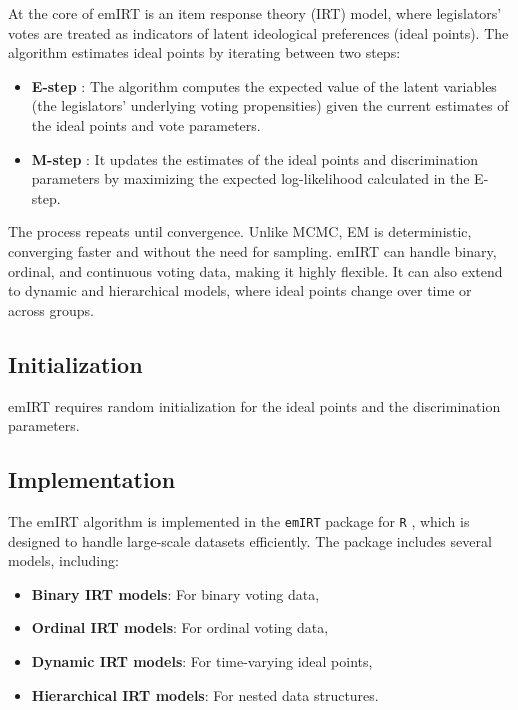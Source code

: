 \documentclass{report}
\begin{document}
                At the core of emIRT is an item response theory (IRT) model, where legislators' votes are treated as
                indicators of latent ideological preferences (ideal points). The algorithm estimates ideal points by
                iterating between two steps:
                \begin{itemize}
                    \item \textbf{E-step}
                    : The algorithm computes the expected value of the latent variables (the legislators' underlying
                    voting propensities) given the current estimates of the ideal points and vote parameters.
                    \item \textbf{M-step}
                    : It updates the estimates of the ideal points and discrimination parameters by maximizing the
                    expected log-likelihood calculated in the E-step.
                \end{itemize}
                The process repeats until convergence. Unlike MCMC, EM is deterministic, converging faster and without
                the need for sampling. emIRT can handle binary, ordinal, and continuous voting data, making it highly
                flexible. It can also extend to dynamic and hierarchical models, where ideal points change over
                time or across groups.

            \subsection{Initialization}
                emIRT requires random initialization for the ideal points and the discrimination
                parameters.

            \subsection{Implementation}
                The emIRT algorithm is implemented in the \texttt{emIRT} package for \texttt{R}
                , which is designed to handle large-scale datasets efficiently. The package includes several
                models, including:
                \begin{itemize}
                    \item \textbf{Binary IRT models}: For binary voting data,
                    \item \textbf{Ordinal IRT models}: For ordinal voting data,
                    \item \textbf{Dynamic IRT models}: For time-varying ideal points,
                    \item \textbf{Hierarchical IRT models}: For nested data structures.
                \end{itemize}
\end{document}
